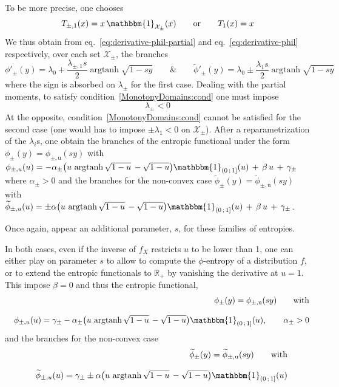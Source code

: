 \documentclass[entropy,article,submit,moreauthors,pdftex]{Definitions/mdpi}
\newcommand{\SZ}[1]{{\color{blue} #1}}                                       %
\def\Rset{\mathbb{R}}%
\def\X{\mathcal{X}}%
\def\un{\mathbbm{1}}%
\def\argtanh{\operatorname{argtanh}}%
\def\u{\mathrm{u}}
\begin{document}
\SZ{To be more precise, one chooses
%
\[
T_{\pm,1}(x) = x \, \un_{\X_\pm}(x)
\qquad \mbox{or} \qquad T_1(x)
= x
\]
%
We     thus    obtain     from    eq.~\eqref{eq:derivative-phil-partial}     and
eq.~\eqref{eq:derivative-phil}  respectively,   over  each  set   $\X_\pm$,  the
branches
%
\[
\phi'_\pm(y)  =  \lambda_0 + \frac{\lambda_{\pm,1} s}{2}  \argtanh\sqrt{1-sy}
  \qquad \mbox{\&} \qquad 
\widetilde{\phi}'_\pm(y)    =   \lambda_0 \pm \frac{\lambda_1 s}{2}
\argtanh\sqrt{1-sy}
\]
%
where the sign is absorbed on $\lambda_\pm$ for the first case. Dealing with the
partial  moments,  to   satisfy  condition~\ref{MonotonyDomains:cond}  one  must
impose $$\lambda_\pm < 0$$ At the opposite, condition~\ref{MonotonyDomains:cond}
cannot be satisfied for the second case  (one would has to impose $\pm \lambda_1
< 0$  on $\X_\pm$).  After a  reparametrization of the $\lambda_i$s,  one obtain
the  branches  of  the  entropic   functional  under  the  form  $\phi_\pm(y)  =
\phi_{\pm,\u}(s  y)$   with  $\phi_{\pm,u}(u)  =   -  \alpha_\pm  \left(   u  \,
\argtanh\sqrt{1-u} \, -  \sqrt{1-u} \right) \un_{\left( 0 \, ;  \, 1 \right]}(u)
\, + \, \beta  \, u \, + \, \gamma_\pm$ where $\alpha_\pm  > 0$ and the branches
for the  non-convex case $\widetilde{\phi}_\pm(y)  = \widetilde{\phi}_{\pm,\u}(s
y)$   with   $   \widetilde{\phi}_{\pm,u}(u)   =  \pm   \alpha   \left(   u   \,
\argtanh\sqrt{1-u} \, -  \sqrt{1-u} \right) \un_{\left( 0 \, ;  \, 1 \right]}(u)
  \, + \, \beta \, u \, + \, \gamma_\pm$.

Once again, appear an additional parameter, $s$, for these families of entropies.

In both cases,  even if the inverse of  $f_X$ restricts $u$ to be  lower than 1,
one can either play on parameter $s$ to allow to compute the $\phi$-entropy of a
distribution  $f$,  or  to  extend  the entropic  functionals  to  $\Rset_+$  by
vanishing  the derivative  at $u  = 1$.  This impose  $\beta =  0$ and  thus the
entropic functional,
%
\begin{eqnarray*}
  &&\phi_\pm(y)  =
  \phi_{\pm,\u}(s  y) \qquad \mbox{with}
  \\[2.5mm]
  && \phi_{\pm,u}(u)  =   \gamma_\pm -  \alpha_\pm  \left(   u  \,
  \argtanh\sqrt{1-u} \, -  \sqrt{1-u} \right) \un_{\left( 0 \, ;  \, 1 \right]}(u), \qquad \alpha_\pm  > 0
\end{eqnarray*}
%
and the branches for the non-convex case
%
\begin{eqnarray*}
  && \widetilde{\phi}_\pm(y)  = \widetilde{\phi}_{\pm,\u}(s
  y) \qquad \mbox{with}
  \\[2.5mm]
  &&\widetilde{\phi}_{\pm,u}(u)   =  \gamma_\pm \pm   \alpha   \left(   u   \,
  \argtanh\sqrt{1-u} \, -  \sqrt{1-u} \right) \un_{\left( 0 \, ;  \, 1 \right]}(u)
    \end{eqnarray*}


}
\end{document}
